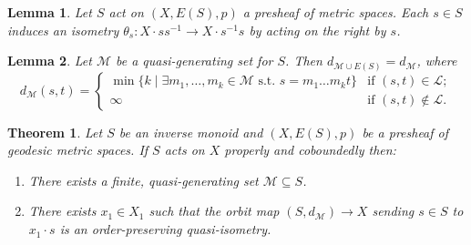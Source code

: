 \documentclass[10pt,a4paper]{amsart}
\newtheorem{lem}{Lemma}
\newtheorem{thm}{Theorem}
\begin{document}
\begin{lem} \label{lem:s_induces_isom}
    Let $S$ act on $(X,E(S),p)$ a presheaf of metric spaces. Each $s \in S$ induces an isometry
    $\theta_s \colon X \cdot ss^{-1} \to X \cdot s^{-1}s$ by acting on the right by $s$.
\end{lem}

\begin{lem}\label{lem:cayley_dist_without_idempotents}
    Let $\mathcal M$ be a quasi-generating set for $S$. Then $d_{\mathcal M\cup E(S)}=d_{\mathcal{M}}$, where $$d_{\mathcal{M}}(s,t)=\begin{cases}
        \min\{k\mid \exists m_1,\ldots, m_k\in \mathcal{M} \mbox{ s.t. }s= m_1\ldots m_kt\}&\mbox{if }(s,t)\in \mathcal{L};\\
        \infty &\mbox{if }(s,t)\not\in \mathcal{L}.
    \end{cases}$$
\end{lem}

\begin{thm}\label{thm:MilnorSchwarz}
	Let $S$ be an inverse monoid and $(X, E(S),p)$ be a presheaf of geodesic metric spaces. 
	If $S$ acts on $X$ properly and coboundedly then:
    \begin{enumerate}
        \item There exists a finite, quasi-generating set $\mathcal{M}\subseteq S$.
        \item\label{item:MS:qi} There exists $x_1\in X_1$ such that the orbit map $(S,d_{\mathcal{M}})\to X$ sending $s\in S$ to $x_1\cdot s$ is an order-preserving quasi-isometry.
    \end{enumerate}
\end{thm}
\end{document}
